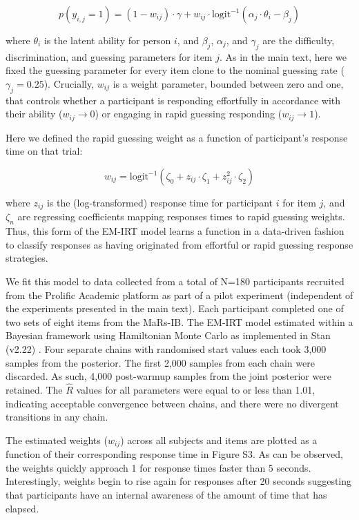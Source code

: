 \documentclass[a4paper,man,natbib]{apa6}
\begin{document}
\begin{equation*}
    p(y_{i,j} = 1) = (1-w_{ij}) \cdot \gamma + w_{ij} \cdot \text{logit}^{-1} \left( \alpha_{j} \cdot \theta_i - \beta_{j} \right)
\end{equation*}

\noindent where $\theta_i$ is the latent ability for person $i$, and $\beta_{j}$, $\alpha_{j}$, and $\gamma_{j}$ are the difficulty, discrimination, and guessing parameters for item $j$. As in the main text, here we fixed the guessing parameter for every item clone to the nominal guessing rate ($\gamma_{j} = 0.25$). Crucially, $w_{ij}$ is a weight parameter, bounded between zero and one, that controls whether a participant is responding effortfully in accordance with their ability ($w_{ij} \rightarrow 0$) or engaging in rapid guessing responding ($w_{ij} \rightarrow 1$).

Here we defined the rapid guessing weight as a function of participant's response time on that trial:

\begin{equation*}
    w_{ij} = \text{logit}^{-1} \left( \zeta_0 + z_{ij} \cdot \zeta_1 + z_{ij}^2 \cdot \zeta_2 \right)
\end{equation*}

\noindent where $z_{ij}$ is the (log-transformed) response time for participant $i$ for item $j$, and  $\zeta_n$ are regressing coefficients mapping responses times to rapid guessing weights. Thus, this form of the EM-IRT model learns a function in a data-driven fashion to classify responses as having originated from effortful or rapid guessing response strategies. 

We fit this model to data collected from a total of N=180 participants recruited from the Prolific Academic platform as part of a pilot experiment (independent of the experiments presented in the main text). Each participant completed one of two sets of eight items from the MaRs-IB. The EM-IRT model estimated within a Bayesian framework using Hamiltonian Monte Carlo as implemented in Stan (v2.22) \citep{carpenter2017stan}. Four separate chains with randomised start values each took 3,000 samples from the posterior. The first 2,000 samples from each chain were discarded. As such, 4,000 post-warmup samples from the joint posterior were retained. The $\hat{R}$ values for all parameters were equal to or less than 1.01, indicating acceptable convergence between chains, and there were no divergent transitions in any chain.  

The estimated weights ($w_{ij}$) across all subjects and items are plotted as a function of their corresponding response time in Figure S3. As can be observed, the weights quickly approach 1 for response times faster than 5 seconds. Interestingly, weights begin to rise again for responses after 20 seconds suggesting that participants have an internal awareness of the amount of time that has elapsed.
\end{document}
